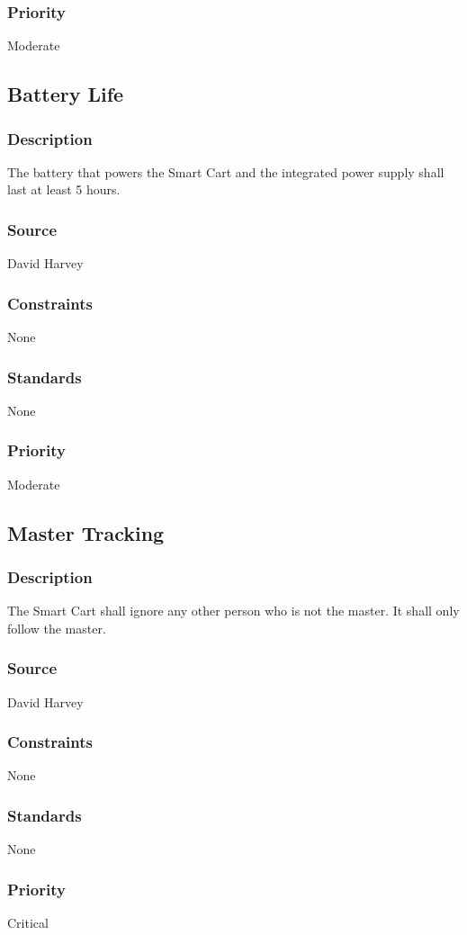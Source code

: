 \subsubsection{Priority}
Moderate


\subsection{Battery Life}
\subsubsection{Description}
The battery that powers the Smart Cart and the integrated power supply shall last at least 5 hours.
\subsubsection{Source}
David Harvey
\subsubsection{Constraints}
None
\subsubsection{Standards}
None
\subsubsection{Priority}
Moderate


\subsection{Master Tracking}
\subsubsection{Description}
The Smart Cart shall ignore any other person who is not the master. It shall only follow the master.
\subsubsection{Source}
David Harvey
\subsubsection{Constraints}
None
\subsubsection{Standards}
None
\subsubsection{Priority}
Critical


